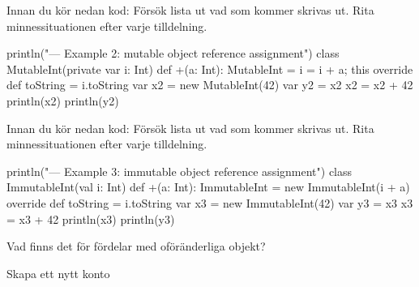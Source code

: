 \Subtask Innan du kör nedan kod: Försök lista ut vad som kommer skrivas ut. Rita minnessituationen efter varje tilldelning.

\begin{Code}
println("\n--- Example 2: mutable object reference assignment")
class MutableInt(private var i: Int) {
  def +(a: Int): MutableInt = { i = i + a; this }
  override def toString = i.toString
}
var x2 = new MutableInt(42)
var y2 = x2
x2 = x2 + 42
println(x2)
println(y2)
\end{Code}

\Subtask Innan du kör nedan kod: Försök lista ut vad som kommer skrivas ut. Rita minnessituationen efter varje tilldelning.

\begin{Code}
println("\n--- Example 3: immutable object reference assignment")
class ImmutableInt(val i: Int) {
  def +(a: Int): ImmutableInt = new ImmutableInt(i + a) 
  override def toString = i.toString
}
var x3 = new ImmutableInt(42)
var y3 = x3
x3 = x3 + 42
println(x3)
println(y3)
\end{Code}

\Subtask\Pen Vad finns det för fördelar med oföränderliga objekt?


\Task Skapa ett nytt konto

\ExtraTasks %

\Task 

\AdvancedTasks %

\Task     
    